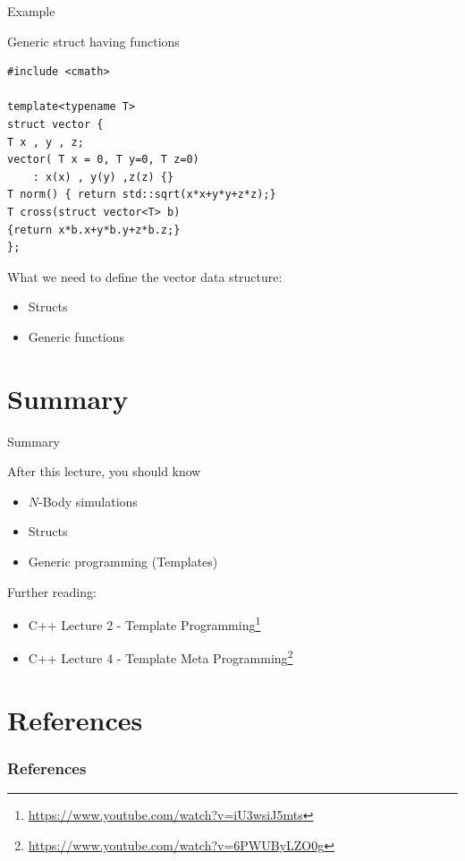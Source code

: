 \documentclass[\classoption]{beamer}
\begin{document}
\begin{frame}[fragile]{Example}
\begin{block}{Generic struct having functions}
\begin{lstlisting}
#include <cmath>

template<typename T>
struct vector {
T x , y , z;
vector( T x = 0, T y=0, T z=0)
	: x(x) , y(y) ,z(z) {}
T norm() { return std::sqrt(x*x+y*y+z*z);}
T cross(struct vector<T> b)
{return x*b.x+y*b.y+z*b.z;}
};
\end{lstlisting}
\end{block}

\begin{block}{What we need to define the vector data structure:}
\begin{itemize}
\item Structs
\item Generic functions
\end{itemize}
\end{block}

\end{frame}





\section{Summary}
\begin{frame}{Summary}
\begin{block}{After this lecture, you should know}
\begin{itemize}
\item $N$-Body simulations
\item Structs
\item Generic programming (Templates)
\end{itemize}
\end{block}

\begin{block}{Further reading:}
\begin{itemize}
\item C++ Lecture 2 - Template Programming\footnote{\tiny\url{https://www.youtube.com/watch?v=iU3wsiJ5mts}}
\item C++ Lecture 4 - Template Meta Programming\footnote{\tiny\url{https://www.youtube.com/watch?v=6PWUByLZO0g}}
\end{itemize}


\end{block}



\end{frame}



\section{References}

\begin{frame}[t, allowframebreaks]
\frametitle{References}


\end{frame}
\end{document}
